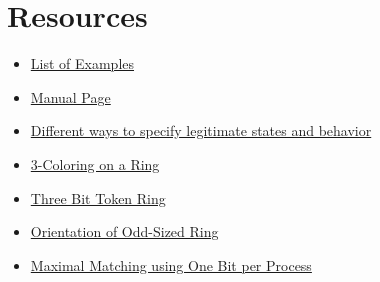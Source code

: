 
\section{Resources}
\begin{itemize}
\item \href{examplelist.html}{List of Examples}
\item \href{man.html}{Manual Page}
\item \href{legit.html}{Different ways to specify legitimate states and behavior}
\item \href{example/ColorRing.html}{3-Coloring on a Ring}
\item \href{example/TokenRingThreeBit.html}{Three Bit Token Ring}
\item \href{example/OrientOddRing.html}{Orientation of Odd-Sized Ring}
\item \href{example/MatchRingOneBit.html}{Maximal Matching using One Bit per Process}
\end{itemize}





